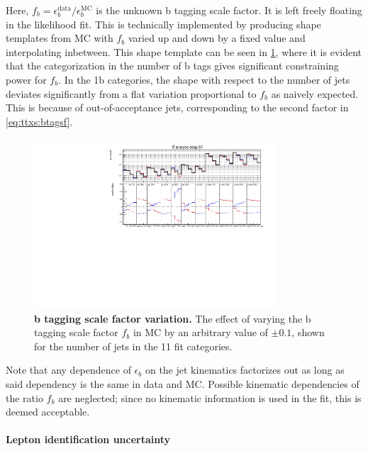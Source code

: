 Here, $f_b = \epsilon_b^{\mathrm{data}}/\epsilon_b^{\mathrm{MC}}$ is the unknown b tagging scale factor. It is left freely floating in the likelihood fit. This is technically implemented by producing shape templates from MC with $f_b$ varied up and down by a fixed value and interpolating inbetween. This shape template can be seen in \cref{fig:ttxs:btagsf}, where it is evident that the categorization in the number of b tags gives significant constraining power for $f_b$. In the 1b categories, the shape with respect to the number of jets deviates significantly from a flat variation proportional to $f_b$ as naively expected. This is because of out-of-acceptance jets, corresponding to the second factor in \cref{eq:ttxs:btagsf}.

\begin{figure}[ht]
    \centering
    \includegraphics[width=0.8\textwidth]{figures/ttxs/scalefactors/btagsf_id_tt.pdf}
    \caption{
       \textbf{b tagging scale factor variation.} The effect of varying the b tagging scale factor $f_b$ in \ttbar MC by an arbitrary value of $\pm 0.1$, shown for the number of jets in the 11 fit categories. 
    }
    \label{fig:ttxs:btagsf}
\end{figure}

Note that any dependence of $\epsilon_b$ on the jet kinematics factorizes out as long as said dependency is the same in data and MC. Possible kinematic dependencies of the ratio $f_b$ are neglected; since no kinematic information is used in the fit, this is deemed acceptable.

\paragraph{Lepton identification uncertainty}


